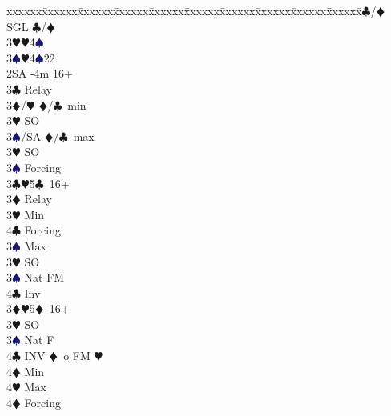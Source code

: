 \documentclass[a4paper,italian]{article}
\newcommand{\BC}{\textcolor{OliveGreen}{$\clubsuit$}}
\newcommand{\BD}{\textcolor{RedOrange}{$\vardiamondsuit$}}
\newcommand{\BH}{\textcolor{Red2}{$\varheartsuit${}}}
\newcommand{\BS}{\textcolor{MidnightBlue}{$\spadesuit${}}}
\newenvironment{bidtable}
{\begin{tabbing}

    xxxxxx\=xxxxxx\=xxxxxx\=xxxxxx\=xxxxxx\=xxxxxx\=xxxxxx\=xxxxxx\=xxxxxx\=xxxxxx\=\kill}
{\end{tabbing} }%
\begin{document}
\begin{multicols*}{2}
\begin{bidtable}
                                            3\BC/\BD \> SGL \BC /\BD \\
                                            3\BH {}\BH 4\BS \\
                                            3\BS {}\BH 4\BS 22\-\-\\
                                            2SA -4m 16+\+\\
                                            3\BC \> Relay\+\\
                                            3\BD/\BH \> \BD /\BC\ min\+\\
                                            3\BH \> SO\-\\
                                            3\BS/SA \> \BD /\BC\ max\-\\
                                            3\BH \> SO\\
                                            3\BS \> Forcing\-\\
                                            3\BC {}\BH 5\BC\ 16+\+\\
                                            3\BD \> Relay\+\\
                                            3\BH \> Min\+\\
                                            4\BC \> Forcing\-\\
                                            3\BS \> Max\-\\
                                            3\BH \> SO\\
                                            3\BS \> Nat FM\\
                                            4\BC \> Inv\-\\
                                            3\BD {}\BH 5\BD\ 16+\+\\
                                            3\BH \> SO\\
                                            3\BS \> Nat F\\
                                            4\BC \> INV \BD\ o FM \BH \+\\
                                            4\BD \> Min\\
                                            4\BH \> Max\-\\
                                            4\BD \> Forcing\-\-
                                        \end{bidtable}


\end{multicols*}
\end{document}
